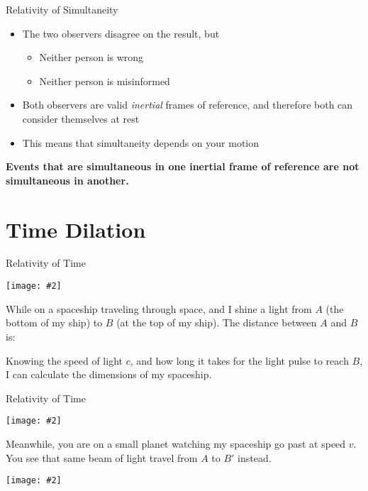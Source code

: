 \documentclass[12pt,compress,aspectratio=169]{beamer}
\newcommand{\pic}[2]{\texttt{[image: \#2]}}
\newcommand{\eq}[2]{\vspace{#1}{\Large\begin{displaymath}#2\end{displaymath}}}
\begin{document}
\begin{frame}{Relativity of Simultaneity}
  \begin{itemize}
  \item The two observers disagree on the result, but
    \begin{itemize}
    \item Neither person is wrong
    \item Neither person is misinformed
    \end{itemize}
  \item Both observers are valid \emph{inertial} frames of reference, and
    therefore both can consider themselves at rest
  \item This means that simultaneity depends on your motion
  \end{itemize}
  
  \vspace{.2in}\textbf{Events that are simultaneous in one inertial frame of
    reference are not simultaneous in another.}
\end{frame}



\section{Time Dilation}

\begin{frame}{Relativity of Time}
  \begin{center}
    \pic{.7}{graphics/spaceship.png}
  \end{center}

  \vspace{-.2in}While on a spaceship traveling through space, and I shine a
  light from $A$ (the bottom of my ship) to $B$ (at the top of my ship). The
  distance between $A$ and $B$ is:

  \eq{-.45in}{
      |AB|=ct
  }

  \vspace{-.2in}Knowing the speed of light $c$, and how long it takes for the
  light pulse to reach $B$, I can calculate the dimensions of my spaceship.
\end{frame}


\begin{frame}{Relativity of Time}
  \begin{center}
    \pic{.7}{graphics/spaceship.png}
  \end{center}
  Meanwhile, you are on a small planet watching my spaceship go past at speed
  $v$. You see that same beam of light travel from $A$ to $B'$ instead.
  \begin{center}
    \pic{.7}{graphics/light-a-b-prime.png}
  \end{center}
\end{frame}
\end{document}
